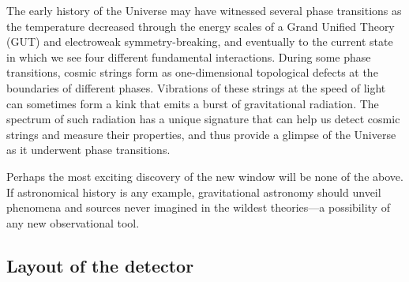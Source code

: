 The early history of the Universe may have witnessed
several phase transitions as the temperature decreased
through the energy scales of a Grand Unified Theory (GUT)
and electroweak symmetry-breaking, and eventually to the
current state in which we see four different fundamental
interactions. During some phase transitions, cosmic strings
form as one-dimensional topological defects at the
boundaries of different phases. Vibrations of these strings
at the speed of light can sometimes form a kink that emits a
burst of gravitational radiation. The spectrum of such radiation
has a unique signature that can help us detect cosmic strings
and measure their properties, and thus provide a glimpse of the
Universe as it underwent phase transitions.

Perhaps the most exciting discovery of the new window will
be none of the above. If astronomical history is any example,
gravitational astronomy should unveil phenomena and
sources never imagined in the wildest theories---a possibility
of any new observational tool.


\FloatBarrier
\newpage
\subsection{Layout of the detector}


